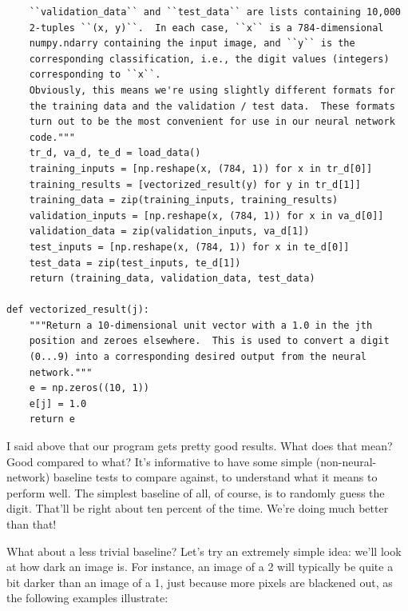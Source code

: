 \documentclass[a4paper,twoside,10pt]{book}
\begin{document}
\begin{lstlisting}
	``validation_data`` and ``test_data`` are lists containing 10,000
	2-tuples ``(x, y)``.  In each case, ``x`` is a 784-dimensional
	numpy.ndarry containing the input image, and ``y`` is the
	corresponding classification, i.e., the digit values (integers)
	corresponding to ``x``.
	Obviously, this means we're using slightly different formats for
	the training data and the validation / test data.  These formats
	turn out to be the most convenient for use in our neural network
	code."""
	tr_d, va_d, te_d = load_data()
	training_inputs = [np.reshape(x, (784, 1)) for x in tr_d[0]]
	training_results = [vectorized_result(y) for y in tr_d[1]]
	training_data = zip(training_inputs, training_results)
	validation_inputs = [np.reshape(x, (784, 1)) for x in va_d[0]]
	validation_data = zip(validation_inputs, va_d[1])
	test_inputs = [np.reshape(x, (784, 1)) for x in te_d[0]]
	test_data = zip(test_inputs, te_d[1])
	return (training_data, validation_data, test_data)

def vectorized_result(j):
	"""Return a 10-dimensional unit vector with a 1.0 in the jth
	position and zeroes elsewhere.  This is used to convert a digit
	(0...9) into a corresponding desired output from the neural
	network."""
	e = np.zeros((10, 1))
	e[j] = 1.0
	return e
\end{lstlisting}
I said above that our program gets pretty good results. What does that mean? Good compared to what? It's informative to have some simple (non-neural-network) baseline tests to compare against, to understand what it means to perform well. The simplest baseline of all, of course, is to randomly guess the digit. That'll be right about ten percent of the time. We're doing much better than that!

What about a less trivial baseline? Let's try an extremely simple idea: we'll look at how dark an image is. For instance, an image of a 2 will typically be quite a bit darker than an image of a 1, just because more pixels are blackened out, as the following examples illustrate:
\end{document}
